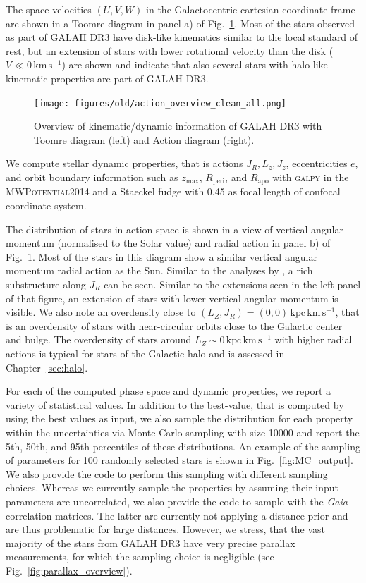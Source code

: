\documentclass[fleqn,usenatbib,useAMS]{mnras}
\newcommand{\Gaia}{\textit{Gaia}\xspace}
\begin{document}
The space velocities $(U,V,W)$ in the Galactocentric cartesian coordinate frame are shown in a Toomre diagram in panel a) of Fig.~\ref{fig:actions_overview}. Most of the stars observed as part of GALAH DR3 have disk-like kinematics similar to the local standard of rest, but an extension of stars with lower rotational velocity than the disk ($V \ll 0\,\mathrm{km\,s^{-1}}$) are shown and indicate that also several stars with halo-like kinematic properties are part of GALAH DR3.

\begin{figure}
\centering
\texttt{[image: figures/old/action\_overview\_clean\_all.png]}
  \caption[{Overview of kinematic/dynamic information of GALAH DR3 with Toomre diagram (left) and Action diagram (right).}]{Overview of kinematic/dynamic information of GALAH DR3 with Toomre diagram (left) and Action diagram (right).}
  \label{fig:actions_overview}
\end{figure}

We compute stellar dynamic properties, that is actions $J_R, L_z, J_z$, eccentricities $e$, and orbit boundary information such as $z_\text{max}$, $R_\text{peri}$, and $R_\text{apo}$ with \textsc{galpy} \citep{Bovy2015} in the \textsc{MWPotential2014} and a Staeckel fudge with 0.45 as focal length of confocal coordinate system.

The distribution of stars in action space is shown in a view of vertical angular momentum (normalised to the Solar value) and radial action in panel b) of Fig.~\ref{fig:actions_overview}. Most of the stars in this diagram show a similar vertical angular momentum radial action as the Sun. Similar to the analyses by \citet{Trick2019}, a rich substructure along $J_R$ can be seen. Similar to the extensions seen in the left panel of that figure, an extension of stars with lower vertical angular momentum is visible. We also note an overdensity close to $(L_Z,J_R) = (0,0)\,\mathrm{kpc\,km\,s^{-1}}$, that is an overdensity of stars with near-circular orbits close to the Galactic center and bulge. The overdensity of stars around $L_Z \sim 0 \,\mathrm{kpc\,km\,s^{-1}}$ with higher radial actions is typical for stars of the Galactic halo and is assessed in Chapter~\ref{sec:halo}.

For each of the computed phase space and dynamic properties, we report a variety of statistical values. In addition to the best-value, that is computed by using the best values as input, we also sample the distribution for each property within the uncertainties via Monte Carlo sampling with size 10000 and report the 5th, 50th, and 95th percentiles of these distributions. An example of the sampling of parameters for 100 randomly selected stars is shown in Fig.~\ref{fig:MC_output}.  We also provide the code to perform this sampling with different sampling choices. Whereas we currently sample the properties by assuming their input parameters are uncorrelated, we also provide the code to sample with the \Gaia correlation matrices. The latter are currently not applying a distance prior and are thus problematic for large distances. However, we stress, that the vast majority of the stars from GALAH DR3 have very precise parallax measurements, for which the sampling choice is negligible (see Fig.~\ref{fig:parallax_overview}).
\end{document}
